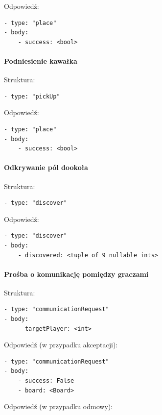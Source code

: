 \documentclass[a4paper]{article}
\begin{document}
Odpowiedź:

\begin{verbatim}
- type: "place"
- body:
    - success: <bool>
\end{verbatim}

\paragraph{Podniesienie kawałka}
\hfill

Struktura:

\begin{verbatim}
- type: "pickUp"
\end{verbatim}

Odpowiedź:

\begin{verbatim}
- type: "place"
- body:
    - success: <bool>
\end{verbatim}

\paragraph{Odkrywanie pól dookoła}
\hfill

Struktura:

\begin{verbatim}
- type: "discover"
\end{verbatim}

Odpowiedź:

\begin{verbatim}
- type: "discover"
- body:
    - discovered: <tuple of 9 nullable ints>
\end{verbatim}

\paragraph{Prośba o komunikację pomiędzy graczami}
\hfill

Struktura:

\begin{verbatim}
- type: "communicationRequest"
- body:
    - targetPlayer: <int>
\end{verbatim}

Odpowiedź (w przypadku akceptacji):

\begin{verbatim}
- type: "communicationRequest"
- body:
    - success: False
    - board: <Board>
\end{verbatim}

Odpowiedź (w przypadku odmowy):
\end{document}
